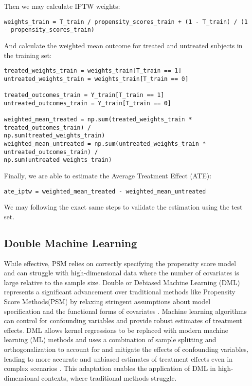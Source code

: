 \documentclass{article}
\begin{document}
\noindent Then we may calculate IPTW weights:
\begin{verbatim}
weights_train = T_train / propensity_scores_train + (1 - T_train) / (1 - propensity_scores_train)
\end{verbatim}

\noindent And calculate the weighted mean outcome for treated and untreated subjects in the training set:
\begin{verbatim}
treated_weights_train = weights_train[T_train == 1]
untreated_weights_train = weights_train[T_train == 0]

treated_outcomes_train = Y_train[T_train == 1]
untreated_outcomes_train = Y_train[T_train == 0]

weighted_mean_treated = np.sum(treated_weights_train * treated_outcomes_train) /
np.sum(treated_weights_train)
weighted_mean_untreated = np.sum(untreated_weights_train * untreated_outcomes_train) /
np.sum(untreated_weights_train)
\end{verbatim}

\noindent Finally, we are able to estimate the Average Treatment Effect (ATE):
\begin{verbatim}
ate_iptw = weighted_mean_treated - weighted_mean_untreated
\end{verbatim}

\noindent We may following the exact same steps to validate the estimation using the test set.


\subsection{Double Machine Learning}
While effective, PSM relies on correctly specifying the propensity score model and can struggle with high-dimensional data where the number of covariates is large relative to the sample size. Double or Debiased Machine Learning (DML) represents a significant advancement over traditional methods like Propensity Score Methods(PSM) by relaxing stringent assumptions about model specification and the functional forms of covariates \cite{fuhr2024estimating}. Machine learning algorithms can control for confounding variables and provide robust estimates of treatment effects. DML allows kernel regressions to be replaced with modern machine learning (ML) methods and uses a combination of sample splitting and orthogonalization to account for and mitigate the effects of confounding variables, leading to more accurate and unbiased estimates of treatment effects even in complex scenarios \cite{chernozhukov2017doubledebiased}. This adaptation enables the application of DML in high-dimensional contexts, where traditional methods struggle.
\end{document}
